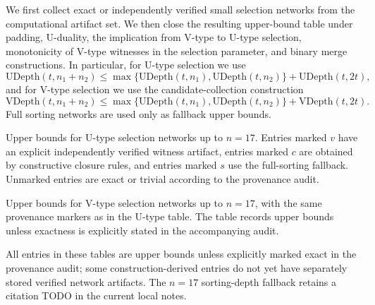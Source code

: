 We first collect exact or independently verified small selection networks from the computational artifact set. We then close the resulting upper-bound table under padding, U-duality, the implication from V-type to U-type selection, monotonicity of V-type witnesses in the selection parameter, and binary merge constructions. In particular, for U-type selection we use
\[
\mathrm{UDepth}(t,n_1+n_2)
\le
\max\{\mathrm{UDepth}(t,n_1),\mathrm{UDepth}(t,n_2)\}
+\mathrm{UDepth}(t,2t),
\]
and for V-type selection we use the candidate-collection construction
\[
\mathrm{VDepth}(t,n_1+n_2)
\le
\max\{\mathrm{UDepth}(t,n_1),\mathrm{UDepth}(t,n_2)\}
+\mathrm{VDepth}(t,2t).
\]
Full sorting networks are used only as fallback upper bounds.

Upper bounds for U-type selection networks up to $n=17$. Entries marked $v$ have an explicit independently verified witness artifact, entries marked $c$ are obtained by constructive closure rules, and entries marked $s$ use the full-sorting fallback. Unmarked entries are exact or trivial according to the provenance audit.

Upper bounds for V-type selection networks up to $n=17$, with the same provenance markers as in the U-type table. The table records upper bounds unless exactness is explicitly stated in the accompanying audit.

All entries in these tables are upper bounds unless explicitly marked exact in the provenance audit; some construction-derived entries do not yet have separately stored verified network artifacts. The $n=17$ sorting-depth fallback retains a citation TODO in the current local notes.
